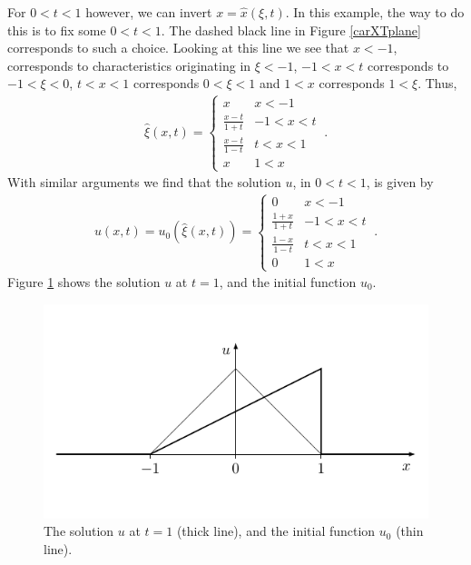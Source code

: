 \documentclass[10pt,letterpaper]{article}
\newcommand{\frb}[1]{ \left(  {#1} \right) }
\theoremstyle{break}
\begin{document}
\begin{solution}
	For $0<t<1$ however, we can invert $x=\hat x\frb{\xi,t}$.
	In this example, the way to do this is to fix some $0<t<1$.
	The dashed black line in Figure \ref{carXTplane} corresponds to such a choice.
	Looking at this line we see that $x<-1$, corresponds to characteristics originating in $\xi<-1$, $-1<x<t$ corresponds to $-1<\xi<0$, $t<x<1$ corresponds $0<\xi<1$ and $1<x$ corresponds $1<\xi$.
	Thus,
	\begin{gather}
		\hat \xi(x,t)=\begin{cases}
				x 	& 	  x<-1\\
				\frac{x-t}{1+t}  	& -1 < x<t\\
				\frac{x-t}{1-t} 	&  t< x<1\\
				x 	&  1 < x
			\end{cases}\ .
	\end{gather}
	With similar arguments we find that the solution $u$, in $0<t<1$, is given by
	\begin{gather}
		u(x,t)=u_0\frb{\hat\xi(x,t)}=
			\begin{cases}
				0 	& 	  x<-1\\
				\frac{1+x}{1+t}  	& -1 < x<t\\
				\frac{1-x}{1-t} 	&  t< x<1\\
				0 	&  1 < x
			\end{cases}\ .
	\end{gather}
	Figure \ref{u01} shows the solution $u$ at $t=1$, and the initial function $u_0$.
	\begin{figure}
	\centering
	\includegraphics[scale=1]{figures01/usol} 
	\caption{The solution $u$ at $t=1$ (thick line), and the initial function $u_0$ (thin line).}
	\label{u01}
	\end{figure}
\end{solution}
\end{document}
